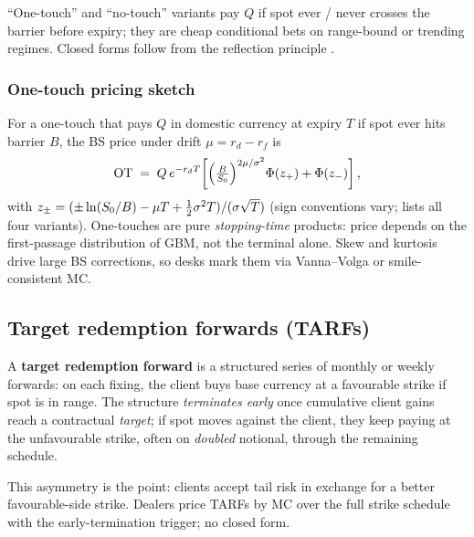 ``One-touch'' and ``no-touch'' variants pay $Q$ if spot ever / never
crosses the barrier before expiry; they are cheap conditional bets on
range-bound or trending regimes.  Closed forms follow from the
reflection principle \citep[][Ch.\ 19]{hull8ed}.

\subsubsection{One-touch pricing sketch}

For a one-touch that pays $Q$ in domestic currency at expiry $T$
if spot ever hits barrier $B$, the BS price under drift
$\mu = r_d - r_f$ is
\begin{equation}
  \mathrm{OT} \;=\; Q\,e^{-r_d T}\!
    \left[ \left(\tfrac{B}{S_0}\right)^{2\mu/\sigma^2}\!
      \Phi(z_+)
    + \Phi(z_-) \right],
  \label{eq:one_touch}
\end{equation}
with
$z_\pm = (\pm \ln(S_0/B) - \mu T + \tfrac12\sigma^2 T)/(\sigma\sqrt{T})$
(sign conventions vary; \citet{clark2011foreign} lists all four
variants).  One-touches are pure \emph{stopping-time} products:
price depends on the first-passage distribution of GBM, not the
terminal alone.  Skew and kurtosis drive large BS corrections, so
desks mark them via Vanna--Volga or smile-consistent MC.

\subsection{Target redemption forwards (TARFs)}

A \textbf{target redemption forward} is a structured series of
monthly or weekly forwards: on each fixing, the client buys base
currency at a favourable strike if spot is in range.  The structure
\emph{terminates early} once cumulative client gains reach a
contractual \emph{target}; if spot moves against the client, they
keep paying at the unfavourable strike, often on \emph{doubled}
notional, through the remaining schedule.

This asymmetry is the point: clients accept tail risk in exchange
for a better favourable-side strike.  Dealers price TARFs by MC over
the full strike schedule with the early-termination trigger; no
closed form.

